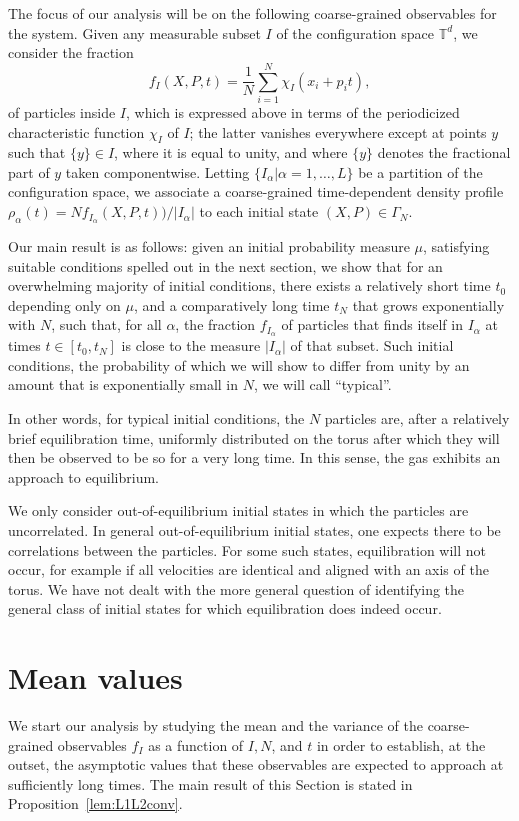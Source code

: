 \documentclass{article}
\newcommand {\T}{\mathbb{T}}
\numberwithin{equation}{section}
\begin{document}
The focus of our analysis will be on the following coarse-grained observables for the system. Given any measurable subset $I$ of the configuration space $\T^d$, we consider the fraction
\begin{equation}
f_{I}(X,P,t)=\frac{1}{N}\sum_{i=1}^{N}\chi_{I}(x_{i}+p_{i}t),
\label{eq:Ifraction}%
\end{equation}
of particles inside $I$, which is expressed above in terms of the periodicized characteristic function $\chi_{I}$ of
$I$; the latter vanishes everywhere except at points $y$ such that $\{y\}\in I$,
where it is equal to unity,  and where  $\{y\}$ denotes the fractional part
of $y$ taken componentwise.
Letting $\{I_\alpha  |  \alpha = 1,\dots, L\}$
be a partition of the configuration space,
we associate a coarse-grained time-dependent density profile $\rho_\alpha(t) = Nf_{I_\alpha} (X,P,t))/ |I_{\alpha}|$
to each initial state $(X,P)\in\Gamma_N$.

Our main result is as follows: given an initial probability measure $\mu$, satisfying suitable conditions spelled out in the next section, we show that for an overwhelming majority of initial conditions, there exists a relatively short time $t_0$ depending only on $\mu$, and a comparatively long time $t_N$ that grows exponentially with  $N$, such that, for all $\alpha$, the fraction $f_{I_\alpha}$ of particles that finds itself in $I_\alpha$ at times $t \in [t_0, t_N]$ is close to the measure $|I_\alpha|$ of that subset.
Such initial conditions, the probability of which we will show to differ from unity by an amount that is exponentially small in $N$, we will call ``typical''.

In other words, for typical initial conditions, the $N$ particles are, after a relatively brief equilibration time, uniformly distributed on the torus after which they will then be observed to be so for a very long time.
In this sense, the gas exhibits an approach to equilibrium.

We only consider out-of-equilibrium initial states in which the particles are uncorrelated. In general out-of-equilibrium initial states, one expects there to be correlations between the particles. For some such states, equilibration will not occur, for example if all velocities are identical and aligned with an axis of the torus. We have not dealt with the more general question of identifying the general class of initial states for which equilibration does indeed occur.

\section{Mean values}\label{s:meanvariance}
We start our analysis by studying the mean and the variance of the coarse-grained
observables $f_I$ as a function of $I,N$, and $t$ in order to establish, at the outset, the asymptotic values that these observables are expected to approach at sufficiently long times. The main result of this Section is stated in Proposition~\ref{lem:L1L2conv}.
\end{document}
